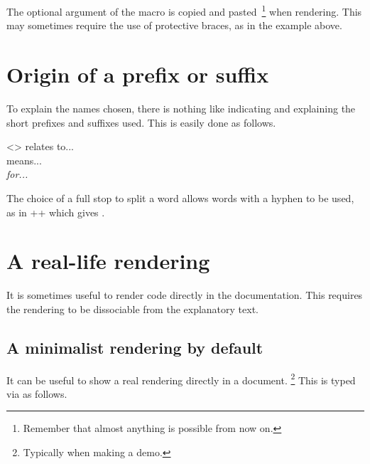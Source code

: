 \begin{tdocwarn}
    The optional argument of the  macro is copied and pasted\,%
    \footnote{
        Remember that almost anything is possible from now on.
    }
    when rendering. This may sometimes require the use of protective braces, as in the example above.
\end{tdocwarn}



\section{Origin of a prefix or suffix}

To explain the names chosen, there is nothing like indicating and explaining the short prefixes and suffixes used. This is easily done as follows.


\begin{tdoclatex}<>
 relates to...      \\
 means...   \\
\emph{ for...}
\end{tdoclatex}


\begin{tdocrem}
    The choice of a full stop to split a word allows words with a hyphen to be used, as in \tdoclatexin++ which gives .
\end{tdocrem}


\section{A real-life rendering}
\label{tutodoc-showcase}

It is sometimes useful to render code directly in the documentation. This requires the rendering to be dissociable from the explanatory text.



\subsection{A minimalist rendering by default}

\begin{tdocexa}
    It can be useful to show a real rendering directly in a document.
    \footnote{
        Typically when making a demo.
    }
    This is typed via  as follows.

\end{tdocexa}


